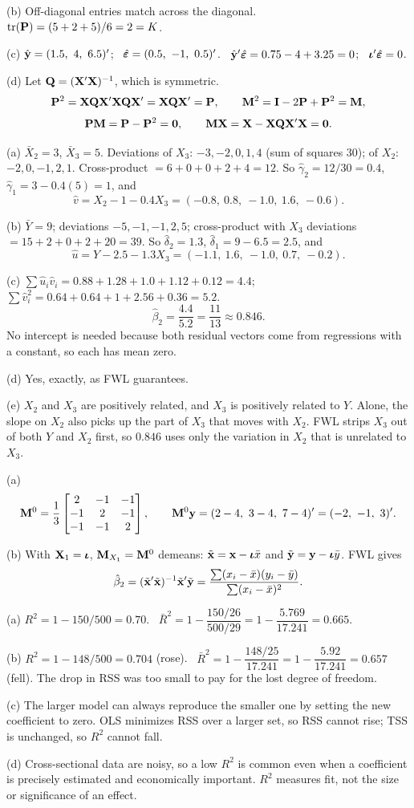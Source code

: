 \documentclass[11pt]{article}
\begin{document}
(b) Off-diagonal entries match across the diagonal. $\operatorname{tr}(\mathbf{P})=(5+2+5)/6=2=K$.

(c) $\hat{\mathbf{y}}=(1.5,\ 4,\ 6.5)'$; \ $\hat{\bm{\varepsilon}}=(0.5,\ -1,\ 0.5)'$. \ $\hat{\mathbf{y}}'\hat{\bm{\varepsilon}}=0.75-4+3.25=0$; \ $\bm{\iota}'\hat{\bm{\varepsilon}}=0$.

(d) Let $\mathbf Q=(\mathbf{X}'\mathbf{X})^{-1}$, which is symmetric.
\[ \mathbf{P}^2=\mathbf{X}\mathbf Q\mathbf{X}'\mathbf{X}\mathbf Q\mathbf{X}'=\mathbf{X}\mathbf Q\mathbf{X}'=\mathbf{P}, \qquad \mathbf{M}^2=\mathbf{I}-2\mathbf{P}+\mathbf{P}^2=\mathbf{M}, \]\[ \mathbf{P}\mathbf{M}=\mathbf{P}-\mathbf{P}^2=\mathbf0, \qquad \mathbf{M}\mathbf{X}=\mathbf{X}-\mathbf{X}\mathbf Q\mathbf{X}'\mathbf{X}=\mathbf0. \]

(a) $\bar X_2=3$, $\bar X_3=5$. Deviations of $X_3$: $-3,-2,0,1,4$ (sum of squares $30$); of $X_2$: $-2,0,-1,2,1$. Cross-product $=6+0+0+2+4=12$. So $\hat\gamma_2=12/30=0.4$, $\hat\gamma_1=3-0.4(5)=1$, and
\[ \hat v=X_2-1-0.4X_3=(-0.8,\ 0.8,\ -1.0,\ 1.6,\ -0.6). \]

(b) $\bar Y=9$; deviations $-5,-1,-1,2,5$; cross-product with $X_3$ deviations $=15+2+0+2+20=39$. So $\hat\delta_2=1.3$, $\hat\delta_1=9-6.5=2.5$, and
\[ \hat u=Y-2.5-1.3X_3=(-1.1,\ 1.6,\ -1.0,\ 0.7,\ -0.2). \]

(c) $\sum\hat u_i\hat v_i=0.88+1.28+1.0+1.12+0.12=4.4$; \ $\sum\hat v_i^2=0.64+0.64+1+2.56+0.36=5.2$.
\[ \hat\beta_2=\frac{4.4}{5.2}=\frac{11}{13}\approx0.846. \]
No intercept is needed because both residual vectors come from regressions with a constant, so each has mean zero.

(d) Yes, exactly, as FWL guarantees.

(e) $X_2$ and $X_3$ are positively related, and $X_3$ is positively related to $Y$. Alone, the slope on $X_2$ also picks up the part of $X_3$ that moves with $X_2$. FWL strips $X_3$ out of both $Y$ and $X_2$ first, so $0.846$ uses only the variation in $X_2$ that is unrelated to $X_3$.

(a)
\[ \mathbf{M}^0=\frac13\begin{bmatrix}2&-1&-1\\-1&2&-1\\-1&-1&2\end{bmatrix}, \qquad \mathbf{M}^0\mathbf{y}=(2-4,\ 3-4,\ 7-4)'=(-2,\ -1,\ 3)'. \]

(b) With $\mathbf{X}_1=\bm{\iota}$, $\mathbf{M}_{X_1}=\mathbf{M}^0$ demeans: $\tilde{\mathbf x}=\mathbf x-\bm{\iota}\bar{x}$ and $\tilde{\mathbf{y}}=\mathbf{y}-\bm{\iota}\bar{y}$. FWL gives
\[ \hat\beta_2=(\tilde{\mathbf x}'\tilde{\mathbf x})^{-1}\tilde{\mathbf x}'\tilde{\mathbf{y}}=\frac{\sum(x_i-\bar{x})(y_i-\bar{y})}{\sum(x_i-\bar{x})^2}. \]

(a) $R^2=1-150/500=0.70$. \ $\bar R^2=1-\dfrac{150/26}{500/29}=1-\dfrac{5.769}{17.241}=0.665$.

(b) $R^2=1-148/500=0.704$ (rose). \ $\bar R^2=1-\dfrac{148/25}{17.241}=1-\dfrac{5.92}{17.241}=0.657$ (fell). The drop in RSS was too small to pay for the lost degree of freedom.

(c) The larger model can always reproduce the smaller one by setting the new coefficient to zero. OLS minimizes RSS over a larger set, so RSS cannot rise; TSS is unchanged, so $R^2$ cannot fall.

(d) Cross-sectional data are noisy, so a low $R^2$ is common even when a coefficient is precisely estimated and economically important. $R^2$ measures fit, not the size or significance of an effect.
\end{document}
